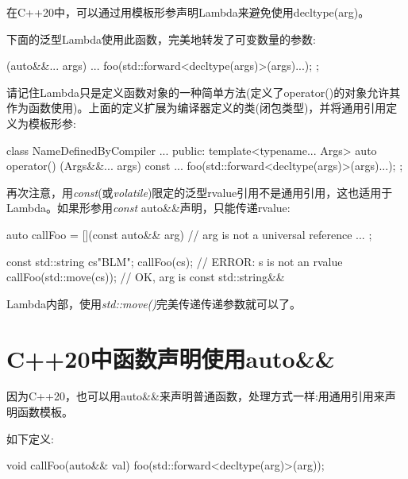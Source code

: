 在C++20中，可以通过用模板形参声明Lambda来避免使用decltype(arg)。\par

下面的泛型Lambda使用此函数，完美地转发了可变数量的参数:\par

\begin{codebox}[cpp]
[] (auto&&... args) {
  ...
  foo(std::forward<decltype(args)>(args)...);
};
\end{codebox}

请记住Lambda只是定义函数对象的一种简单方法(定义了operator()的对象允许其作为函数使用)。上面的定义扩展为编译器定义的类(闭包类型)，并将通用引用定义为模板形参:\par

\begin{codebox}[cpp]
class NameDefinedByCompiler {
  ...
  public:
  template<typename... Args>
  auto operator() (Args&&... args) const {
    ...
    foo(std::forward<decltype(args)>(args)...);
  }
};
\end{codebox}

再次注意，用\textit{const}(或\textit{volatile})限定的泛型rvalue引用不是通用引用，这也适用于Lambda。如果形参用\textit{const} auto\&\&声明，只能传递rvalue:\par

\begin{codebox}[cpp]
auto callFoo = [](const auto&& arg) { // arg is not a universal reference
  ...
};

const std::string cs{"BLM"};
callFoo(cs); // ERROR: s is not an rvalue
callFoo(std::move(cs)); // OK, arg is const std::string&&
\end{codebox}

Lambda内部，使用\textit{std::move()}完美传递传递参数就可以了。\par


\section{C++20中函数声明使用auto\&\&}

因为C++20，也可以用auto\&\&来声明普通函数，处理方式一样:用通用引用来声明函数模板。\par

如下定义:\par

\begin{codebox}[cpp]
void callFoo(auto&& val) {
  foo(std::forward<decltype(arg)>(arg));
}
\end{codebox}

